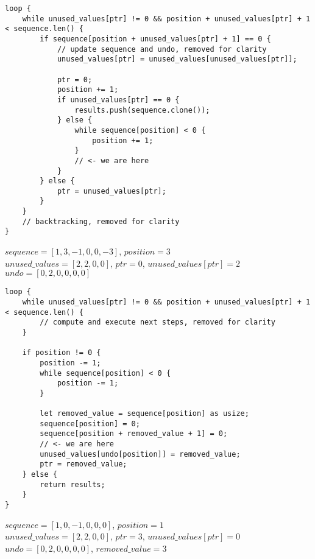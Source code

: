 \begin{frame}[fragile]
    \begin{verbatim}
loop {
    while unused_values[ptr] != 0 && position + unused_values[ptr] + 1 < sequence.len() {
        if sequence[position + unused_values[ptr] + 1] == 0 {
            // update sequence and undo, removed for clarity
            unused_values[ptr] = unused_values[unused_values[ptr]];
            
            ptr = 0;
            position += 1;
            if unused_values[ptr] == 0 {
                results.push(sequence.clone());
            } else {
                while sequence[position] < 0 {
                    position += 1;
                }
                // <- we are here
            }
        } else {
            ptr = unused_values[ptr];
        }
    }
    // backtracking, removed for clarity
}
    \end{verbatim}
    $sequence = [1, 3, -1, 0, 0, -3]$, $position = 3$\\
    $unused\_values = [2, 2, 0, 0]$, $ptr = 0$, $unused\_values[ptr] = 2$\\
    $undo = [0, 2, 0, 0, 0, 0]$
\end{frame}
\begin{frame}[fragile]
    \begin{verbatim}
loop {
    while unused_values[ptr] != 0 && position + unused_values[ptr] + 1 < sequence.len() {
        // compute and execute next steps, removed for clarity
    }
    
    if position != 0 {
        position -= 1;
        while sequence[position] < 0 {
            position -= 1;
        }
        
        let removed_value = sequence[position] as usize;
        sequence[position] = 0;
        sequence[position + removed_value + 1] = 0;
        // <- we are here
        unused_values[undo[position]] = removed_value;
        ptr = removed_value;
    } else {
        return results;
    }
}
    \end{verbatim}
    $sequence = [1, 0, -1, 0, 0, 0]$, $position = 1$\\
    $unused\_values = [2, 2, 0, 0]$, $ptr = 3$, $unused\_values[ptr] = 0$\\
    $undo = [0, 2, 0, 0, 0, 0]$, $removed\_value = 3$
\end{frame}
